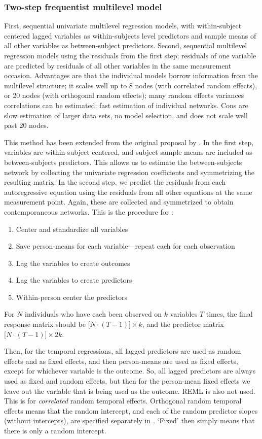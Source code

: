 \subsubsection{Two-step frequentist multilevel model}
First, sequential univariate multilevel regression models, with within-subject centered lagged variables as within-subjects level predictors and sample means of all other variables as between-subject predictors. Second, sequential multilevel regression models using the residuals from the first step; residuals of one variable are predicted by residuals of all other variables in the same measurement occasion. Advantages are that the individual models borrow information from the multilevel structure; it scales well up to 8 nodes (with correlated random effects), or 20 nodes (with orthogonal random effects); many random effects variances correlations can be estimated; fast estimation of individual networks. Cons are slow estimation of larger data sets, no model selection, and does not scale well past 20 nodes. 

This method has been extended from the original proposal by \cite{bringmann2013network}. In the first step, variables are within-subject centered, and subject sample means are included as between-subjects predictors. This allows us to estimate the between-subjects network by collecting the univariate regression coefficients and symmetrizing the resulting matrix. In the second step, we predict the residuals from each autoregressive equation using the residuals from all other equations at the same measurement point. Again, these are collected and symmetrized to obtain contemporaneous networks. This is the procedure for :
\begin{enumerate}
    \item Center and standardize all variables
    \item Save person-means for each variable---repeat each for each observation
    \item Lag the variables to create outcomes
    \item Lag the variables to create predictors
    \item Within-person center the predictors
\end{enumerate}
For $N$ individuals who have each been observed on $k$ variables $T$ times, the final response matrix should be $\lbrack N \cdot (T - 1) \rbrack \times k$, and the predictor matrix $\lbrack N \cdot (T - 1) \rbrack \times 2k$.

Then, for the temporal regressions, all lagged predictors are used as random effects and as fixed effects, and then person-means are used as fixed effects, except for whichever variable is the outcome. So, all lagged predictors are always used as fixed and random effects, but then for the person-mean fixed effects we leave out the variable that is being used as the outcome. REML is also not used. This is for \textit{correlated} random temporal effects. Orthogonal random temporal effects means that the random intercept, and each of the random predictor slopes (without intercepts), are specified separately in . `Fixed' then simply means that there is only a random intercept.

